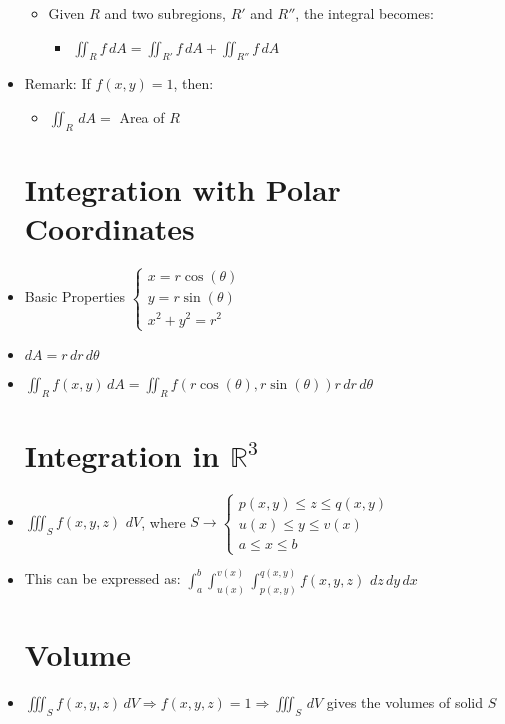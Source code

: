 \begin{itemize}
\begin{itemize}
      \item Given $R$ and two subregions, $R'$ and $R''$, the integral becomes:

        \begin{itemize}

          \item $\displaystyle \iint_R f\,dA = \iint_{R'} f\,dA + \iint_{R''} f\,dA$

        \end{itemize}

    \end{itemize}

  \item Remark: If $f(x,y)=1$, then:

    \begin{itemize}

      \item $\displaystyle \iint_R\,dA =$ Area of $R$

    \end{itemize}

    \section{Integration with Polar Coordinates}

  \item Basic Properties $\left\{\begin{array}{c} x=r\cos(\theta)\\y=r\sin(\theta)\\x^2+y^2=r^2  \end{array}$

  \item $dA = r\,dr\,d\theta$

  \item $\displaystyle \iint_R f(x,y)\,dA=\displaystyle \iint_R f(r\cos(\theta), r\sin(\theta))r\,dr\,d\theta$

    \section{Integration in $\mathbb{R}^3$}

  \item $\displaystyle \iiint_S f(x,y,z)\,\,dV$, where $S\rightarrow\left\{\begin{array}{l} p(x,y) \leq z \leq q(x,y)\\ u(x) \leq y \leq v(x)\\ a \leq x \leq b  \end{array}$

    \item This can be expressed as: $\displaystyle \int_a^b\int_{u(x)}^{v(x)}\int_{p(x,y)}^{q(x,y)} f(x,y,z)\,\,dz\,dy\,dx$

      \section{Volume}

    \item $\displaystyle \iiint_S f(x,y,z)\, dV\Rightarrow f(x,y,z) = 1 \Rightarrow \iiint_S\,dV$ gives the volumes of solid $S $

\end{itemize}



